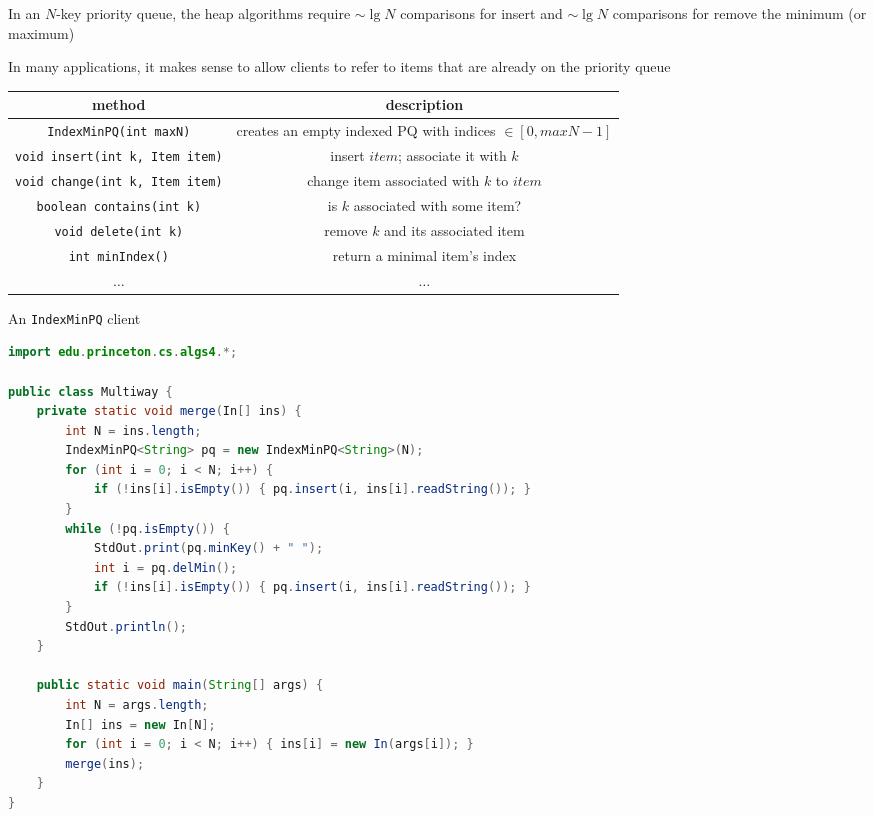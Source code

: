 \documentclass[8pt,a4paper,compress]{beamer}
\begin{document}
\begin{frame}[fragile]
\pause

In an $N$-key priority queue, the heap algorithms require $\sim \lg N$ comparisons for insert and $\sim \lg N$ comparisons for remove the minimum (or maximum)

\pause
\bigskip

In many applications, it makes sense to allow clients to refer to items that are already on the priority queue 

\pause

\begin{center}
\begin{tabular}{cc}
method & description \\ \hline
\lstinline$IndexMinPQ(int maxN)$ & \makecell{creates an empty indexed PQ with \\ indices $\in [0, maxN - 1]$} \\
\lstinline$void insert(int k, Item item)$ & insert $item$; associate it with $k$ \\
\lstinline$void change(int k, Item item)$ & change item associated with $k$ to $item$ \\
\lstinline$boolean contains(int k)$ & is $k$ associated with some item? \\
\lstinline$void delete(int k)$ & remove $k$ and its associated item \\
\lstinline$int minIndex()$ & return a minimal item's index \\
$\dots$ & $\dots$
\end{tabular} 
\end{center}
\end{frame}

\begin{frame}[fragile]
\pause

An \lstinline{IndexMinPQ} client
\begin{lstlisting}[language=Java]
import edu.princeton.cs.algs4.*;

public class Multiway { 
    private static void merge(In[] ins) { 
        int N = ins.length; 
        IndexMinPQ<String> pq = new IndexMinPQ<String>(N); 
        for (int i = 0; i < N; i++) { 
            if (!ins[i].isEmpty()) { pq.insert(i, ins[i].readString()); }
        } 
        while (!pq.isEmpty()) {
            StdOut.print(pq.minKey() + " "); 
            int i = pq.delMin(); 
            if (!ins[i].isEmpty()) { pq.insert(i, ins[i].readString()); }
        }
        StdOut.println();
    } 

    public static void main(String[] args) { 
        int N = args.length; 
        In[] ins = new In[N]; 
        for (int i = 0; i < N; i++) { ins[i] = new In(args[i]); } 
        merge(ins); 
    } 
} 
\end{lstlisting}
\end{frame}
\end{document}
